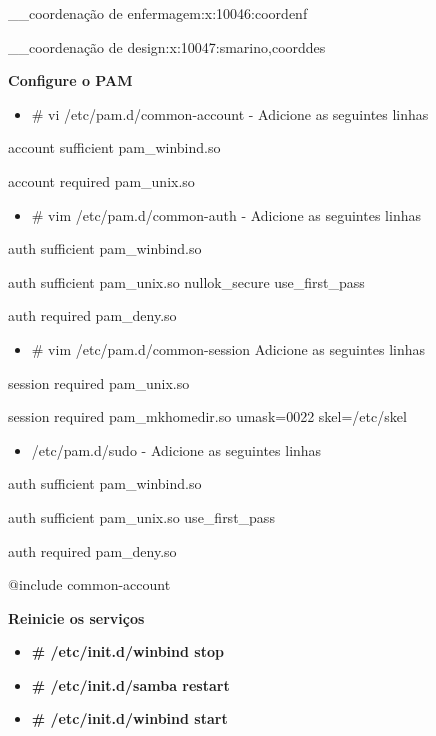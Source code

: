 \_\_coordenação de enfermagem:x:10046:coordenf

\_\_coordenação de design:x:10047:smarino,coorddes

\textbf{Configure o PAM}

\begin{itemize}
	\item {\# vi /etc/pam.d/common-account} - Adicione as seguintes linhas
\end{itemize}

account sufficient       pam\_winbind.so

account required         pam\_unix.so

\begin{itemize}
	\item {\# vim /etc/pam.d/common-auth} - Adicione as seguintes linhas
\end{itemize}

auth sufficient pam\_winbind.so

auth sufficient pam\_unix.so nullok\_secure use\_first\_pass

auth required   pam\_deny.so

\begin{itemize}
	\item {\# vim /etc/pam.d/common-session} Adicione as seguintes linhas
\end{itemize}

session required pam\_unix.so

session required pam\_mkhomedir.so umask=0022 skel=/etc/skel

\begin{itemize}
	\item {/etc/pam.d/sudo} - Adicione as seguintes linhas
\end{itemize}

auth sufficient pam\_winbind.so

auth sufficient pam\_unix.so use\_first\_pass

auth required   pam\_deny.so

$@$include common-account



\textbf{Reinicie os serviços}

\begin{itemize}
	\item \textbf{\# /etc/init.d/winbind stop}
	\item \textbf{\# /etc/init.d/samba restart}
	\item \textbf{\# /etc/init.d/winbind start}
\end{itemize}

